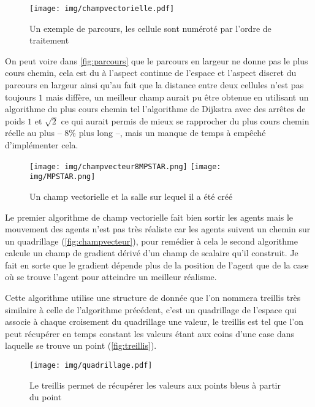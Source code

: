 \documentclass{article}
\begin{document}
\begin{figure}[h]
  \centering
  \texttt{[image: img/champvectorielle.pdf]}
  \caption{Un exemple de parcours, les cellule sont numéroté par l'ordre
    de traitement}
  \label{fig:parcours}
\end{figure}

On peut voire dans \autoref{fig:parcours} que le parcours en largeur ne
donne pas le plus cours chemin, cela est du à l'aspect continue de l'espace
et l'aspect discret du parcours en largeur ainsi qu'au fait que la distance
entre deux cellules n'est pas toujours $1$ mais diffère, un meilleur champ aurait
pu être obtenue en utilisant un algorithme du plus cours chemin tel l'algorithme
de Dijkstra avec des arrêtes de poids $1$ et $\sqrt{2}$ ce qui aurait permis
de mieux se rapprocher du plus cours chemin réelle au plus --
$8\%$ plus long \cite{Nash12} --, mais
un manque de temps à empêché d'implémenter cela.

\begin{figure}[h]
  \centering
  \texttt{[image: img/champvecteur8MPSTAR.png]}
  \texttt{[image: img/MPSTAR.png]}
  \caption{Un champ vectorielle et la salle sur lequel il a été créé}
  \label{fig:champvecteur}
\end{figure}

Le premier algorithme de champ vectorielle fait bien sortir les agents
mais le mouvement des agents n'est pas très réaliste car les agents
suivent un chemin sur un quadrillage (\autoref{fig:champvecteur}), pour
remédier à cela le second algorithme calcule un champ de gradient dérivé
d'un champ de scalaire qu'il construit. Je fait en sorte que le gradient
dépende plus de la position de l'agent que de la case où se trouve l'agent
pour atteindre un meilleur réalisme.

Cette algorithme utilise une structure de donnée que l'on nommera treillis
très similaire à celle de l'algorithme
précédent, c'est un quadrillage de l'espace qui associe à chaque croisement
du quadrillage une valeur, le treillis est tel que l'on peut récupérer
en temps constant les valeurs étant aux coins d'une case dans laquelle se
trouve un point (\autoref{fig:treillis}).

\begin{figure}[h]
  \centering
  \texttt{[image: img/quadrillage.pdf]}
  \caption{Le treillis permet de récupérer les valeurs aux points bleus à
    partir du point}
  \label{fig:treillis}
\end{figure}
\end{document}
